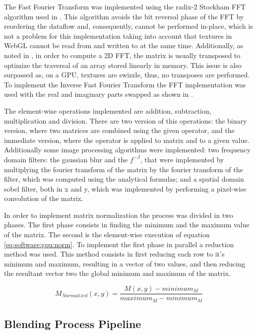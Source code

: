 	    The Fast Fourier Transform was implemented using the radix-2 Stockham FFT algorithm used in \cite{Lloyd2008}. This algorithm avoids the bit reversal phase of the FFT by reordering the dataflow and, consequently, cannot be performed in-place, which is not a problem for this implementation taking into account that textures in WebGL cannot be read from and written to at the same time. Additionally, as noted in \cite{Lloyd2008}, in order to compute a 2D FFT, the matrix is usually transposed to optimize the traversal of an array stored linearly in memory. This issue is also surpassed as, on a GPU, textures are swizzle, thus, no transposes are performed. 
	    To implement the Inverse Fast Fourier Transform the FFT implementation was used with the real and imaginary parts swapped as shown in \cite[p.450]{Lyons2004}.
	    
	    The element-wise operations implemented are addition, subtraction, multiplication and division. There are two version of this operations: the binary version, where two matrices are combined using the given operator, and the immediate version, where the operator is applied to matrix and to a given value. Additionally some image processing algorithms were implemented: two frequency domain filters: the gaussian blur and the $f^{-\beta}$, that were implemented by multiplying the fourier transform of the matrix by the fourier transform of the filter, which was computed using the analytical formulas; and a spatial domain sobel filter, both in x and y, which was implemented by performing a pixel-wise convolution of the matrix.
	    
	    In order to implement matrix normalization the process was divided in two phases. The first phase consists in finding the minimum and the maximum value of the matrix. The second is the element-wise execution of equation \ref{eq:software:gpu:norm}. To implement the first phase in parallel a reduction method was used. This method consists in first reducing each row to it's minimum and maximum, resulting in a vector of two values, and then reducing the resultant vector two the global minimum and maximum of the matrix.
	    
	    \begin{equation} \label{eq:software:gpu:norm}
		  M_{Normalized}(x, y) = \frac{M(x, y) - minimum_M}{maximum_M - minimum_M}
	    \end{equation}
	    
    \subsection {Blending Process Pipeline} %
      
